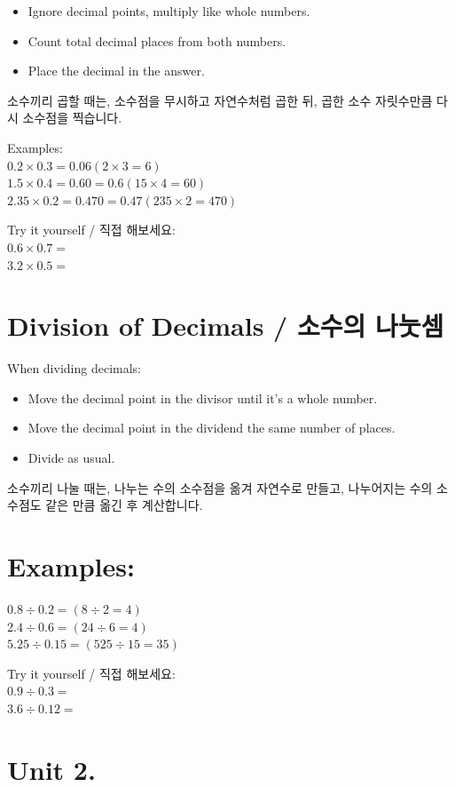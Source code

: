 \documentclass[10pt]{article}
\begin{document}
\begin{itemize}
  \item Ignore decimal points, multiply like whole numbers.
  \item Count total decimal places from both numbers.
  \item Place the decimal in the answer.
\end{itemize}

소수끼리 곱할 때는, 소수점을 무시하고 자연수처럼 곱한 뒤, 곱한 소수 자릿수만큼 다시 소수점을 찍습니다.

Examples:\\
$0.2 \times 0.3=0.06(2 \times 3=6)$\\
$1.5 \times 0.4=0.60=0.6(15 \times 4=60)$\\
$2.35 \times 0.2=0.470=0.47(235 \times 2=470)$

Try it yourself / 직접 해보세요:\\
$0.6 \times 0.7=$\\
$3.2 \times 0.5=$

\section*{Division of Decimals / 소수의 나눗셈}
When dividing decimals:

\begin{itemize}
  \item Move the decimal point in the divisor until it's a whole number.
  \item Move the decimal point in the dividend the same number of places.
  \item Divide as usual.
\end{itemize}

소수끼리 나눌 때는, 나누는 수의 소수점을 옮겨 자연수로 만들고, 나누어지는 수의 소수점도 같은 만큼 옮긴 후 계산합니다.

\section*{Examples:}
$0.8 \div 0.2=(8 \div 2=4)$\\
$2.4 \div 0.6=(24 \div 6=4)$\\
$5.25 \div 0.15=(525 \div 15=35)$

Try it yourself / 직접 해보세요:\\
$0.9 \div 0.3=$\\
$3.6 \div 0.12=$

\section*{Unit 2.}
\end{document}
